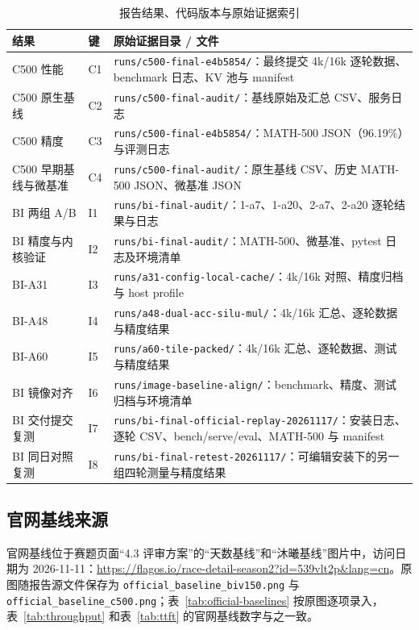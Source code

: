 \documentclass[11pt,a4paper]{ctexart}
\begin{document}
\begin{table}[!htbp]
\centering\footnotesize
\caption{报告结果、代码版本与原始证据索引\label{tab:evidence}}
\begin{tabularx}{\linewidth}{@{}p{2.7cm}p{1.1cm}Y@{}}
\toprule
结果 & 键 & 原始证据目录 / 文件 \\
\midrule
C500 性能 & C1 & \texttt{runs/c500-final-e4b5854/}：最终提交 4k/16k 逐轮数据、benchmark 日志、KV 池与 manifest \\
C500 原生基线 & C2 & \texttt{runs/c500-final-audit/}：基线原始及汇总 CSV、服务日志 \\
C500 精度 & C3 & \texttt{runs/c500-final-e4b5854/}：MATH-500 JSON（96.19\%）与评测日志 \\
C500 早期基线与微基准 & C4 & \texttt{runs/c500-final-audit/}：原生基线 CSV、历史 MATH-500 JSON、微基准 JSON \\
BI 两组 A/B & I1 & \texttt{runs/bi-final-audit/}：1-a7、1-a20、2-a7、2-a20 逐轮结果与日志 \\
BI 精度与内核验证 & I2 & \texttt{runs/bi-final-audit/}：MATH-500、微基准、pytest 日志及环境清单 \\
BI-A31 & I3 & \texttt{runs/a31-config-local-cache/}：4k/16k 对照、精度归档与 host profile \\
BI-A48 & I4 & \texttt{runs/a48-dual-acc-silu-mul/}：4k/16k 汇总、逐轮数据与精度结果 \\
BI-A60 & I5 & \texttt{runs/a60-tile-packed/}：4k/16k 汇总、逐轮数据、测试与精度结果 \\
BI 镜像对齐 & I6 & \texttt{runs/image-baseline-align/}：benchmark、精度、测试归档与环境清单 \\
BI 交付提交复测 & I7 & \texttt{runs/bi-final-official-replay-20261117/}：安装日志、逐轮 CSV、bench/serve/eval、MATH-500 与 manifest \\
BI 同日对照复测 & I8 & \texttt{runs/bi-final-retest-20261117/}：可编辑安装下的另一组四轮测量与精度结果 \\
\bottomrule
\end{tabularx}
\end{table}

\subsection{官网基线来源}
官网基线位于赛题页面“4.3 评审方案”的“天数基线”和“沐曦基线”图片中，访问日期为 2026-11-11：\url{https://flagos.io/race-detail-season2?id=539vlt2p&lang=cn}。原图随报告源文件保存为 \texttt{official\_baseline\_biv150.png} 与 \texttt{official\_baseline\_c500.png}；表~\ref{tab:official-baselines} 按原图逐项录入，表~\ref{tab:throughput} 和表~\ref{tab:ttft} 的官网基线数字与之一致。
\end{document}
